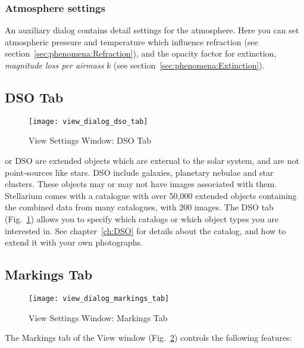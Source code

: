 \subsubsection{Atmosphere settings}
\label{sec:gui:view:sky:atmosphere}

An auxiliary dialog contains detail settings for the atmosphere. Here
you can set atmospheric pressure and temperature which influence
refraction (see section~\ref{sec:phenomena:Refraction}), and the
opacity factor for extinction, \emph{magnitude loss per airmass} $k$
(see section~\ref{sec:phenomena:Extinction}).


\subsection{DSO Tab}
\label{sec:gui:view:dso}

\begin{figure}[t]
\texttt{[image: view\_dialog\_dso\_tab]}
\caption{View Settings Window: DSO Tab}
\label{fig:gui:view:dso}
\end{figure}


 or DSO are extended objects which are
external to the solar system, and are not point-sources like stars.
DSO include galaxies, planetary nebulae and star clusters. These
objects may or may not have images associated with them. Stellarium
comes with a catalogue with over 50,000 extended objects containing
the combined data from many catalogues, with 200 images.  The DSO tab
(Fig.~\ref{fig:gui:view:dso}) allows you to specify which catalogs or
which object types you are interested in. See chapter~\ref{ch:DSO} for
details about the catalog, and how to extend it with your own photographs.





\subsection{Markings Tab}
\label{sec:gui:view:markings}

\begin{figure}[t]
\centering\texttt{[image: view\_dialog\_markings\_tab]}
\caption{View Settings Window: Markings Tab}
\label{fig:gui:view:markings}
\end{figure}

The Markings tab of the View window
(Fig.~\ref{fig:gui:view:markings}) controls the following features:

